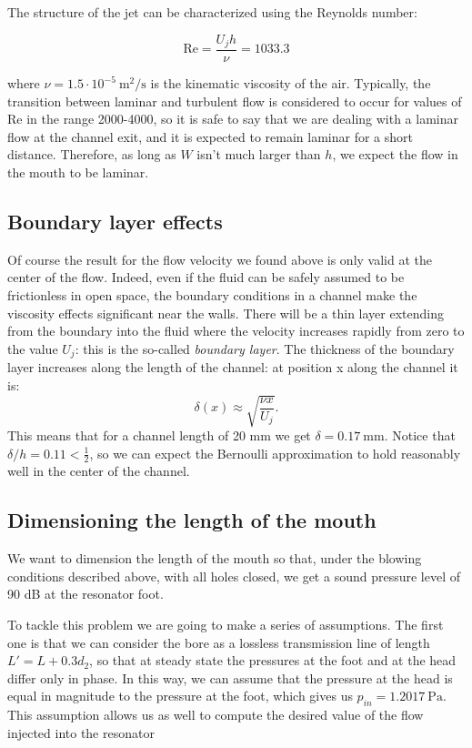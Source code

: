 \documentclass[a4paper]{article}
\begin{document}
The structure of the jet can be characterized using the Reynolds number:

$$ \mathrm{Re} = \frac{U_j h}{\nu} = 1033.3 $$

where $\nu = 1.5 \cdot 10^{-5}~ \si{\meter\squared\per\second}$ is the kinematic viscosity of the air. Typically, the transition between laminar and turbulent flow is considered to occur for values of Re in the range 2000-4000, so it is safe to say that we are dealing with a laminar flow at the channel exit, and it is expected to remain laminar for a short distance. Therefore, as long as $W$ isn't much larger than $h$, we expect the flow in the mouth to be laminar. 

\subsection{Boundary layer effects}
Of course the result for the flow velocity we found above is only valid at the center of the flow. Indeed, even if the fluid can be safely assumed to be frictionless in open space, the boundary conditions in a channel make the viscosity effects significant near the walls. There will be a thin layer extending from the boundary into the fluid where the velocity increases rapidly from zero to the value $U_j$: this is the so-called \emph{boundary layer}. The thickness of the boundary layer increases along the length of the channel: at position x along the channel it is:
$$ \delta(x) \approx \sqrt{\frac{\nu x}{U_j}}. $$
This means that for a channel length of 20 mm we get $\delta = \SI{0.17}{\milli\meter}$. Notice that $\delta/h = 0.11 < \frac{1}{2}$, so we can expect the Bernoulli approximation to hold reasonably well in the center of the channel.

\subsection{Dimensioning the length of the mouth}
We want to dimension the length of the mouth so that, under the blowing conditions described above, with all holes closed, we get a sound pressure level of 90 dB at the resonator foot.

To tackle this problem we are going to make a series of assumptions. The first one is that we can consider the bore as a lossless transmission line of length $L' = L + 0.3d_2$, so that at steady state the pressures at the foot and at the head differ only in phase. In this way, we can assume that the pressure at the head is equal in magnitude to the pressure at the foot, which gives us $p_{in} = 1.2017~\si{\pascal}$. This assumption allows us as well to compute the desired value of the flow injected into the resonator 
\end{document}
